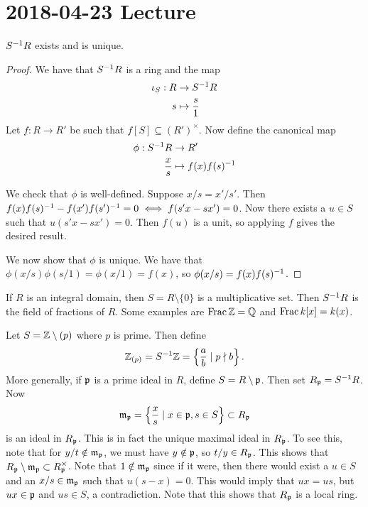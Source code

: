 \section{2018-04-23 Lecture}

\begin{prop}[2.2]
	$S^{-1} R$ exists and is unique.
\end{prop}

\begin{proof}
	We have that $S^{-1} R$ is a ring and the map
	\begin{align*}
	  \iota_S: R &\to S^{-1} R \\
	  s &\mapsto \frac{s}{1}
	\end{align*}
	Let $f: R \to R'$ be such that $f[S] \subseteq (R')^\times$.
	Now define the canonical map
	\begin{align*}
	  \phi: S^{-1} R &\to R' \\
	  \frac{x}{s} &\mapsto f(x)f(s)^{-1}
	\end{align*}

	We check that $\phi$ is well-defined.
	Suppose $x/s = x'/s'$.
	Then $f(x)f(s)^{-1}-f(x')f(s')^{-1}=0 \iff f(s'x-sx')=0$.
	Now there exists a $u \in S$ such that $u(s'x-sx')=0$.
	Then $f(u)$ is a unit, so applying $f$ gives the desired result.

	We now show that $\phi$ is unique.
	We have that $\phi(x/s)\phi(s/1) = \phi(x/1)=f(x)$, so $\phi(x/s)=f(x)f(s)^{-1}$.
\end{proof}

\begin{exam}
  \leavevmode
  \begin{enum}
    \io
    If $R$ is an integral domain, then $S = R \setminus \{0\}$ is a multiplicative set.
    Then $S^{-1} R$ is the field of fractions of $R$.
    Some examples are $\operatorname{Frac}\mathbb{Z}=\mathbb{Q}$ and $\operatorname{Frac} k[x]=k(x)$.

    \io
    Let $S=\mathbb{Z}\setminus(p)$ where $p$ is prime.
    Then define
    \[\mathbb{Z}_{(p)}=S^{-1}\mathbb{Z} = \left\{ \frac{a}{b} \mid p \nmid b \right\}.\]
    More generally, if $\mathfrak{p}$ is a prime ideal in $R$, define $S = R \setminus \mathfrak{p}$.
    Then set $R_{\mathfrak{p}} = S^{-1} R$.
    Now
    \[\mathfrak{m}_{\mathfrak{p}} = \left\{ \frac{x}{s} \mid x \in \mathfrak{p}, s \in S \right\} \subset R_{\mathfrak{p}}\]
    is an ideal in $R_{\mathfrak{p}}$.
    This is in fact the unique maximal ideal in $R_{\mathfrak{p}}$.
    To see this, note that for $y/t \notin \mathfrak{m}_{\mathfrak{p}}$, we must have $y \notin \mathfrak{p}$, so $t/y \in R_{\mathfrak{p}}$.
    This shows that $R_{\mathfrak{p}} \setminus \mathfrak{m}_{\mathfrak{p}} \subset R_{\mathfrak{p}}^\times$.
    Note that $1 \notin \mathfrak{m}_{\mathfrak{p}}$ since if it were, then there would exist a $u \in S$ and an $x/s \in \mathfrak{m}_{\mathfrak{p}}$ such that $u(s-x)=0$.
    This would imply that $ux=us$, but $ux \in \mathfrak{p}$ and $us \in S$, a contradiction.
    Note that this shows that $R_{\mathfrak{p}}$ is a local ring.
  \end{enum}
\end{exam}

